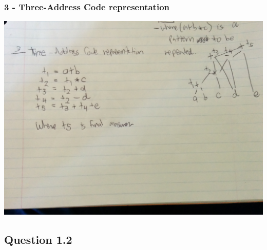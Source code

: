 \documentclass[11pt, oneside]{article}   	%
\begin{document}
\subsubsection{3 - Three-Address Code representation}

\includegraphics[scale=0.15]{IMG_20141025_154609.jpg}

\subsection{Question 1.2}
\end{document}
